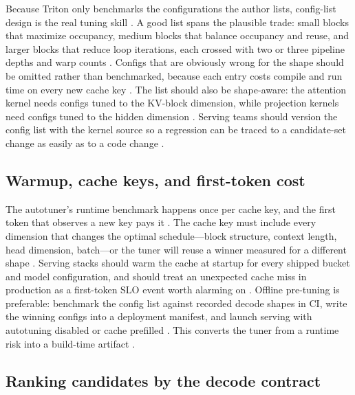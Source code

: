 Because Triton only benchmarks the configurations the author lists, config-list design is the real tuning skill \citep{tritonlang2024,patel2025llminference}. A good list spans the plausible trade: small blocks that maximize occupancy, medium blocks that balance occupancy and reuse, and larger blocks that reduce loop iterations, each crossed with two or three pipeline depths and warp counts \citep{memoryfloor2026,nvidia2022hopper}. Configs that are obviously wrong for the shape should be omitted rather than benchmarked, because each entry costs compile and run time on every new cache key \citep{tritonlang2024,taxbreak2026}. The list should also be shape-aware: the attention kernel needs configs tuned to the KV-block dimension, while projection kernels need configs tuned to the hidden dimension \citep{kwon2023vllm,memoryfloor2026}. Serving teams should version the config list with the kernel source so a regression can be traced to a candidate-set change as easily as to a code change \citep{chen2020compilerbasedhardw,patel2025llminference}.

\subsection{Warmup, cache keys, and first-token cost}

The autotuner's runtime benchmark happens once per cache key, and the first token that observes a new key pays it \citep{tritonlang2024,patel2025llminference}. The cache key must include every dimension that changes the optimal schedule---block structure, context length, head dimension, batch---or the tuner will reuse a winner measured for a different shape \citep{taxbreak2026,memoryfloor2026}. Serving stacks should warm the cache at startup for every shipped bucket and model configuration, and should treat an unexpected cache miss in production as a first-token SLO event worth alarming on \citep{kwon2023vllm,patel2025llminference}. Offline pre-tuning is preferable: benchmark the config list against recorded decode shapes in CI, write the winning configs into a deployment manifest, and launch serving with autotuning disabled or cache prefilled \citep{chen2020compilerbasedhardw,taxbreak2026}. This converts the tuner from a runtime risk into a build-time artifact \citep{memoryfloor2026,tritonlang2024}.

\subsection{Ranking candidates by the decode contract}

